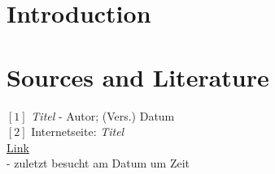 \documentclass[11pt, letterpaper, onecolumn]{article}
\begin{document}
	
	
	\tableofcontents
	
	
	
	
	
	\vspace{50cm}
	
	\section{Introduction}
	












	


	

	
	
	
	


	
	
\newpage
	

	
\section{Sources and Literature} \label{sources}

		$[1]$ \textit{Titel} - Autor; (Vers.) Datum
\vspace{0.4cm}
		 \\
		$[2]$ Internetseite: \textit{Titel} \\ \url{Link} \\- zuletzt besucht am Datum um Zeit
		
\end{document}
